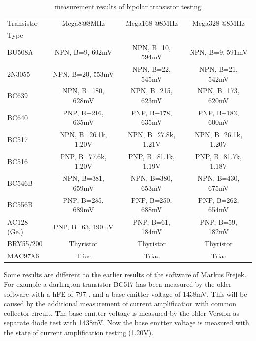 \begin{table}[H]
  \begin{center}
    \begin{tabular}{| l | c | c | c |}
    \hline
     Transistor & Mega8@8MHz & Mega168 @8MHz & Mega328 @8MHz \\
     Type   &                  &                  &                  \\
    \hline
    \hline
BU508A      & NPN, B=9, 602mV     & NPN, B=10, 594mV    & NPN, B=9, 591mV   \\
    \hline
2N3055      & NPN, B=20, 553mV    & NPN, B=22, 545mV    & NPN, B=21, 542mV  \\
    \hline
BC639       & NPN, B=180, 628mV   & NPN, B=215, 623mV   & NPN, B=173, 620mV \\
    \hline
BC640       & PNP, B=216, 635mV   & PNP, B=178, 635mV   & PNP, B=183, 600mV \\
    \hline
BC517       & NPN, B=26.1k, 1.20V & NPN, B=27.8k, 1.21V & NPN, B=26.1k, 1.20V\\
    \hline
BC516       & PNP, B=77.6k, 1.20V & PNP, B=81.1k, 1.19V & PNP, B=81.7k, 1.18V\\
    \hline
BC546B      & NPN, B=381, 659mV   & NPN, B=380, 653mV   & NPN, B=430, 675mV \\
    \hline
BC556B      & PNP, B=285, 689mV   & PNP, B=250, 688mV   & PNP, B=262, 654mV \\
    \hline
AC128 (Ge.) & PNP, B=63, 190mV    & PNP, B=61, 184mV    & PNP, B=59, 182mV  \\
    \hline
BRY55/200   & Thyristor           & Thyristor           & Thyristor        \\
    \hline
MAC97A6     & Triac               & Triac               & Triac        \\
    \hline
    \end{tabular}
  \end{center}
  \caption{measurement results of bipolar transistor testing}
  \label{tab:bipolar} 
\end{table}

Some results are different to the earlier results of the software of Markus Frejek.
For example a darlington transistor BC517 has been measured by the older software
with a hFE of 797 .
and a base emitter voltage of 1438mV.
This will be caused by the additional measurement of current amplification with common collector circuit.
The base emitter voltage is measured by the older Version as separate diode test with 1438mV.
Now the base emitter voltage is measured with the state of current amplification testing (1.20V).

